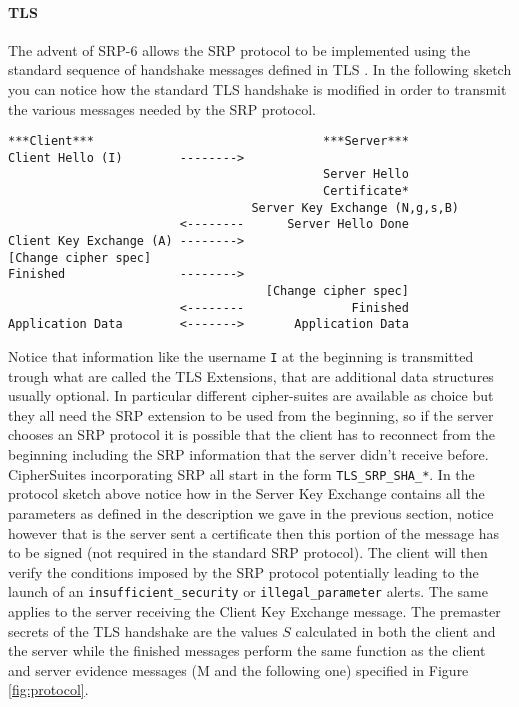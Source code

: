 \documentclass[11pt]{article}
\begin{document}
\paragraph*{TLS} The advent of SRP-6 allows the SRP protocol to be implemented using the standard sequence of handshake messages defined in TLS \cite{RFC5054}. In the following sketch you can notice how the standard TLS handshake is modified in order to transmit the various messages needed by the SRP protocol.
\begin{verbatim}
***Client***                                ***Server***
Client Hello (I)        -------->
                                            Server Hello
                                            Certificate*
                                  Server Key Exchange (N,g,s,B)
                        <--------      Server Hello Done
Client Key Exchange (A) -------->
[Change cipher spec]
Finished                -------->
                                    [Change cipher spec]
                        <--------               Finished
Application Data        <------->       Application Data
\end{verbatim}
Notice that information like the username \texttt{I} at the beginning is transmitted trough what are called the TLS Extensions, that are additional data structures usually optional. In particular different cipher-suites are available as choice but they all need the SRP extension to be used from the beginning, so if the server chooses an SRP protocol it is possible that the client has to reconnect from the beginning including the SRP information that the server didn't receive before. CipherSuites incorporating SRP all start in the form \texttt{TLS\_SRP\_SHA\_*}. In the protocol sketch above notice how in the Server Key Exchange contains all the parameters as defined in the description we gave in the previous section, notice however that is the server sent a certificate then this portion of the message has to be signed (not required in the standard SRP protocol). The client will then verify the conditions imposed by the SRP protocol potentially leading to the launch of an \texttt{insufficient\_security} or \texttt{illegal\_parameter} alerts. The same applies to the server receiving the Client Key Exchange message. The premaster secrets of the TLS handshake are the values $S$ calculated in both the client and the server while the finished messages perform the same function as the client and server evidence messages (M and the following one) specified in Figure \ref{fig:protocol}.
\end{document}
